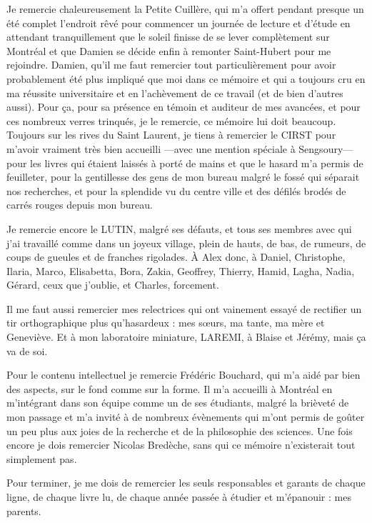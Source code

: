 {Je remercie chaleureusement la Petite Cuillère, qui m'a offert pendant presque un été complet l'endroit rêvé pour commencer un journée de lecture et d'étude en attendant tranquillement que le soleil finisse de se lever complètement sur Montréal et que Damien se décide enfin à remonter Saint-Hubert pour me rejoindre. Damien, qu'il me faut remercier tout particulièrement pour avoir probablement été plus impliqué que moi dans ce mémoire et qui a toujours cru en ma réussite universitaire et en l'achèvement de ce travail (et de bien d'autres aussi). Pour ça, pour sa présence en témoin et auditeur de mes avancées, et pour ces nombreux verres trinqués, je le remercie, ce mémoire lui doit beaucoup. Toujours sur les rives du Saint Laurent, je tiens à remercier le CIRST pour m'avoir vraiment très bien accueilli ---avec une mention spéciale à Sengsoury--- pour les livres qui étaient laissés à porté de mains et que le hasard m'a permis de feuilleter, pour la gentillesse des gens de mon bureau malgré le fossé qui séparait nos recherches, et pour la splendide vu du centre ville et des défilés brodés de carrés rouges depuis mon bureau.

Je remercie encore le LUTIN, malgré ses défauts, et tous ses membres avec qui j'ai travaillé comme dans un joyeux village, plein de hauts, de bas, de rumeurs, de coups de gueules et de franches rigolades. \`A Alex donc, à Daniel, Christophe, Ilaria, Marco, Elisabetta, Bora, Zakia, Geoffrey, Thierry, Hamid, Lagha, Nadia, Gérard, ceux que j'oublie, et Charles, forcement.

Il me faut aussi remercier mes relectrices qui ont vainement essayé de rectifier un tir orthographique plus qu'hasardeux : mes s\oe urs, ma tante, ma mère et Geneviève.
Et à mon laboratoire miniature, LAREMI, à Blaise et Jérémy, mais ça va de soi.

Pour le contenu intellectuel je remercie Frédéric Bouchard, qui m'a aidé par bien des aspects, sur le fond comme sur la forme. Il m'a accueilli à Montréal en m'intégrant dans son équipe comme un de ses étudiants, malgré la brièveté de mon passage et m'a invité à de nombreux évènements qui m'ont permis de goûter un peu plus aux joies de la recherche et de la philosophie des sciences. Une fois encore je dois remercier Nicolas Bredèche, sans qui ce mémoire n'existerait tout simplement pas. 

Pour terminer, je me dois de remercier les seuls responsables et garants de chaque ligne, de chaque livre lu, de chaque année passée à étudier et m'épanouir : mes parents.
}
